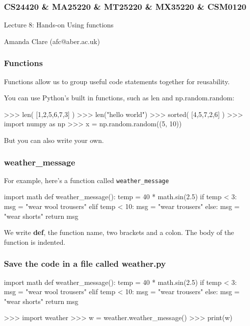 \documentclass{beamer}
\begin{document}
\begin{frame}
\frametitle{CS24420 \& MA25220 \& MT25220 \& MX35220 \& CSM0120}

\begin{center}
\begin{huge}
Lecture 8: Hands-on Using functions 
\end{huge}
\bigskip

Amanda Clare (afc@aber.ac.uk)

\end{center}
\end{frame}


\begin{frame}[fragile]
\frametitle{Functions}
Functions allow us to group useful code statements
together for reusability.

\bigskip

You can use Python's built in functions, such
as len and np.random.random:
\begin{code}
>>> len( [1,2,5,6,7,3] )
>>> len("hello world")
>>> sorted( [4,5,7,2,6] )
>>> import numpy as np
>>> x = np.random.random((5, 10))
\end{code}
But you can also write your own.
\end{frame}


\begin{frame}[fragile]
\frametitle{weather\_message}
For example, here's a function called \texttt{weather\_message}
\begin{code}
import math
def weather_message():
   temp = 40 * math.sin(2.5)
   if temp < 3:
      msg = "wear wool trousers"
   elif temp < 10:
      msg = "wear trousers"
   else: 
      msg = "wear shorts"
   return msg
\end{code}

We write \textbf{def}, the function name, two brackets and a
colon.
The body of the function is indented.
\end{frame}

\begin{frame}[fragile]
\frametitle{Save the code in a file called weather.py}
\begin{shaded}
\begin{code}
import math
def weather_message():
   temp = 40 * math.sin(2.5)
   if temp < 3:
      msg = "wear wool trousers"
   elif temp < 10:
      msg = "wear trousers"
   else: 
      msg = "wear shorts"
   return msg
\end{code}
\end{shaded}
\begin{code}
>>> import weather
>>> w = weather.weather_message()
>>> print(w)
\end{code}
\end{frame}
\end{document}
